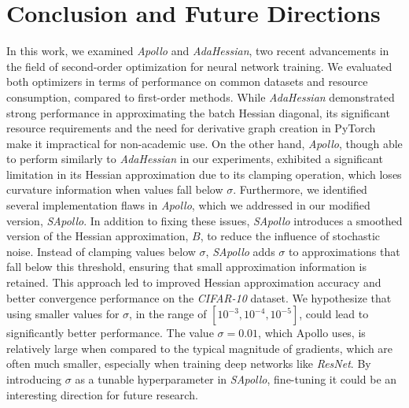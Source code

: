 
\chapter{Conclusion and Future Directions}
In this work, we examined \emph{Apollo} and \emph{AdaHessian}, two recent advancements in the field of second-order optimization for neural network training.
We evaluated both optimizers in terms of performance on common datasets and resource consumption,
compared to first-order methods. While \emph{AdaHessian} demonstrated strong performance in approximating the batch Hessian diagonal,
its significant resource requirements and the need for derivative graph creation in PyTorch make it impractical for non-academic use. 
On the other hand, \emph{Apollo}, though able to perform similarly to \emph{AdaHessian} in our experiments,
exhibited a significant limitation in its Hessian approximation due to its clamping operation,
which loses curvature information when values fall below $\sigma$.
Furthermore, we identified several implementation flaws in \emph{Apollo}, which we addressed in our modified version,
\emph{SApollo}.
In addition to fixing these issues, \emph{SApollo} introduces a smoothed version of the Hessian approximation,
$B$, to reduce the influence of stochastic noise. Instead of clamping values below $\sigma$, \emph{SApollo} adds $\sigma$ to approximations
that fall below this threshold, ensuring that small approximation information is retained.
This approach led to improved Hessian approximation accuracy and better convergence performance on the \emph{CIFAR-10} dataset.
We hypothesize that using smaller values for $\sigma$, in the range of $[10^{-3}, 10^{-4}, 10^{-5}]$,
could lead to significantly better performance.
The value $\sigma = 0.01$, which Apollo uses, is relatively large when compared to the typical magnitude of gradients,
which are often much smaller, especially when training deep networks like \emph{ResNet}.
By introducing $\sigma$ as a tunable hyperparameter in \emph{SApollo}, fine-tuning it could be an interesting direction for future research.

